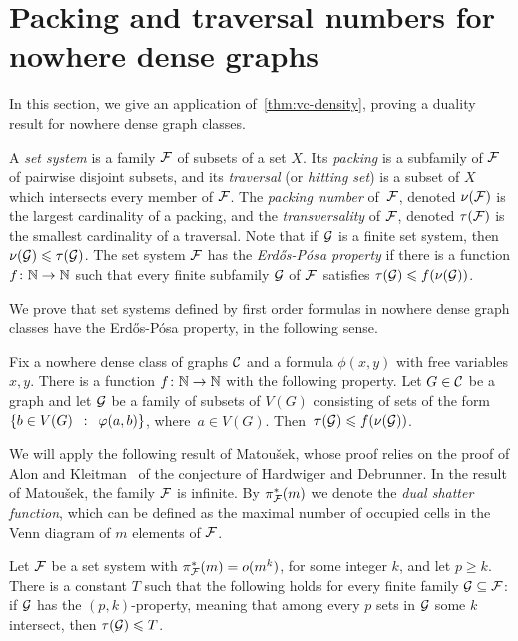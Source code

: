 \section{Packing and traversal numbers for nowhere dense graphs}
In this section, we give an application 
of~\cref{thm:vc-density}, proving a 
duality result for nowhere dense graph classes.

A \emph{set system} is a family  $\cal F$ of subsets of a set $X$.
Its  \emph{packing} is a subfamily of $\cal F$ of pairwise disjoint subsets, and its \emph{traversal} (or \emph{hitting set}) is a subset of $X$ which intersects every member of $\cal F$.
The \emph{packing number} of~$\cal F$, denoted $\nu(\cal F)$ is the largest cardinality of a packing,
and the \emph{transversality} of $\cal F$, denoted
$\tau(\cal F)$ is the smallest cardinality of a traversal.
Note that if $\cal G$ is a finite set system, then
$\nu({\cal G})\le \tau(\cal G)$. 
The set system $\cal F$ has the \emph{Erd{\H o}s-P\'{o}sa property} if there is a function $f\from\N\to\N$ such that every finite subfamily $\cal G$ of $\cal F$
satisfies $\tau({\cal G})\le f(\nu(\cal G))$. 

We prove that set systems defined by first order formulas in nowhere dense graph classes have the Erd{\H o}s-P\'{o}sa property, in the following sense.

\begin{theorem}\label{thm:erdos-posa}
	Fix a nowhere dense class of graphs $\CCC$ and a 
	formula $\phi(x,y)$ with free variables $x,y$.
	There is a function $f\from \N\to\N$ with the following property.
	Let $G\in \CCC$ be a graph and let $\cal G$
	be a family of subsets of $V(G)$ consisting of sets of the form $\setof{b\in V(G)}{\phi(a, b)}$, where~$a\in V(G)$.
Then~$\tau({\cal G})\le f(\nu(\cal G))$.
\end{theorem}



We will apply the following result of Matou{\v s}ek,
 whose proof relies on the  proof of Alon and Kleitman~\cite{ALON1992103} of the conjecture of Hardwiger and Debrunner. 
In the result of Matou{\v s}ek, the family $\cal F$ is infinite. By $\pi_{\cal F}^*(m)$ we denote the \emph{dual shatter function}, which can be defined as the maximal number 
of occupied cells in the Venn diagram of $m$ elements of $\cal F$.


\begin{theorem}\label{thm:pq}
	Let $\cal F$ be a set system with $\pi^*_{\cal F}(m)=o(m^k)$,
	for some integer $k$, and let $p\ge k$.
	There is a constant $T$ such that the following holds for every finite family $\cal G\subset \cal F$: 
	if $\cal G$ has the $(p,k)$-property, meaning that 
	among every $p$ sets in $\cal G$ some $k$ intersect, then $\tau ({\cal G})\le T$.
\end{theorem}


